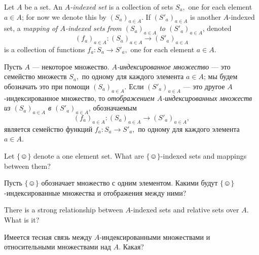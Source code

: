 \documentclass[../main/CT4S-EN-RU]{subfiles}
\begin{document}
\begin{definitionENG}\label{def:indexed sets}
Let $A$ be a set. An {\em $A$-indexed set} is a collection of sets $S_a,$ one for each element $a\in A$; for now we denote this by $(S_a)_{a\in A}.$ If $(S'_a)_{a\in A}$ is another $A$-indexed set, a {\em mapping of $A$-indexed sets from $(S_a)_{a\in A}$ to $(S'_a)_{a\in A}$}, denoted $$(f_a)_{a\in A}\colon(S_a)_{a\in A}{→} (S'_a)_{a\in A}$$ is a collection of functions $f_a\colon S_a{→} S'_a,$ one for each element $a\in A.$
\end{definitionENG}

\begin{definitionRUS}\label{def:indexed sets}
Пусть $A$ — некоторое множество. {\em $A$-индексированное множество} — это семейство множеств $S_a,$ по одному для каждого элемента $a\in A$; мы будем обозначать это при помощи $(S_a)_{a\in A}.$ Если $(S'_a)_{a\in A}$ — это другое $A$-индексированное множество, то {\em отображением $A$-индексированных множеств из $(S_a)_{a\in A}$ в $(S'_a)_{a\in A}$}, обозначаемым $$(f_a)_{a\in A}\colon(S_a)_{a\in A}{→} (S'_a)_{a\in A},$$ является семейство функций $f_a\colon S_a{→} S'_a,$ по одному для каждого элемента $a\in A.$
\end{definitionRUS}

\begin{exerciseENG}
Let ${\{☺\}}$ denote a one element set. What are ${\{☺\}}$-indexed sets and mappings between them?
\end{exerciseENG}

\begin{exerciseRUS}
Пусть ${\{☺\}}$ обозначает множество с одним элементом. Какими будут ${\{☺\}}$-индексированные множества и отображения между ними?
\end{exerciseRUS}

\begin{exerciseENG}
There is a strong relationship between $A$-indexed sets and relative sets over $A.$ What is it?
\end{exerciseENG}

\begin{exerciseRUS}
Имеется тесная связь между $A$-индексированными множествами и относительными множествами над $A.$ Какая?
\end{exerciseRUS}
\end{document}
